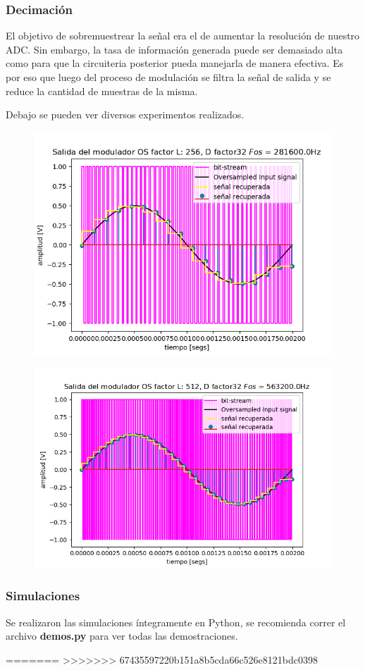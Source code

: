 \subsubsection{Decimación}
El objetivo de sobremuestrear la señal era el de aumentar la resolución de nuestro ADC. Sin embargo, la tasa de información generada puede ser demasiado alta como para que la circuiteria posterior pueda manejarla de manera efectiva. Es por eso que luego del proceso de modulación se filtra la señal de salida y se reduce la cantidad de muestras de la misma.

Debajo se pueden ver diversos experimentos realizados.

\begin{figure}[H]
	\centering
	\includegraphics[width=0.7\linewidth]{ImagenesEjercicio2/SenalRecuperada256.png}
	\caption{}
	\label{fig:senalrecuperada256}
\end{figure}
\begin{figure}[H]
	\centering
	\includegraphics[width=0.7\linewidth]{ImagenesEjercicio2/SenalRecuperada512.png}
	\caption{}
	\label{fig:senalrecuperada256}
\end{figure}

\subsubsection{Simulaciones}
Se realizaron las simulaciones íntegramente en Python, se recomienda correr el archivo \textbf{demos.py} para ver todas las demostraciones.


=======
>>>>>>> 67435597220b151a8b5cda66c526e8121bdc0398
